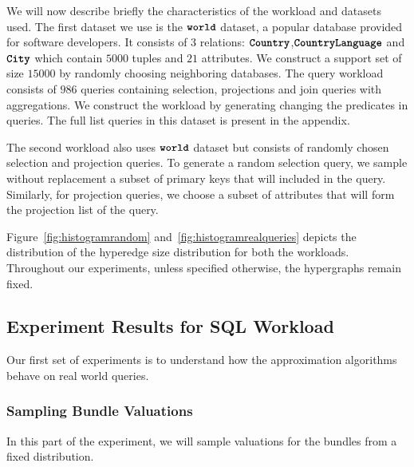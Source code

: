 We will now describe briefly the characteristics of the workload and datasets used. The first dataset we use is the $\texttt{\bfseries world}$ dataset, a popular database provided for software developers. 
It consists of $3$ relations: $\texttt{\bfseries Country}$,$\texttt{\bfseries CountryLanguage}$ and $\texttt{\bfseries City}$ which contain $5000$ tuples and $21$ attributes. We construct a support set of size $15000$ by randomly choosing neighboring databases. 
The query workload consists of $986$ queries containing selection, projections and join queries with aggregations. We construct the workload by generating changing the predicates in queries. The full list queries in this dataset is present in the appendix.

The second workload also uses $\texttt{\bfseries world}$ dataset but consists of randomly chosen selection and projection queries. To generate a random selection query, we  sample without replacement a subset of primary keys that will included in the query. Similarly, for projection queries, we choose a subset of attributes that will form the projection list of the query.

Figure~\ref{fig:histogramrandom} and~\ref{fig:histogramrealqueries} depicts the distribution of the hyperedge size distribution for both the workloads. Throughout our experiments, unless specified otherwise, the hypergraphs remain fixed.


\subsection{Experiment Results for SQL Workload}

Our first set of experiments is to understand how the approximation algorithms behave on real world queries. 


\subsubsection{Sampling Bundle Valuations} 
In this part of the experiment, we will sample valuations for the bundles from a fixed distribution.

